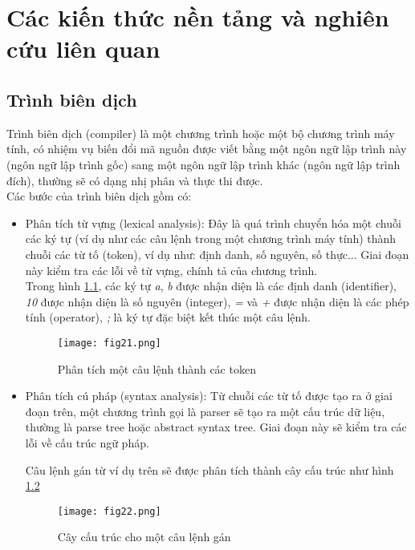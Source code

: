 \chapter{Các kiến thức nền tảng và nghiên cứu liên quan}
\section{Trình biên dịch}
Trình biên dịch (compiler) là một chương trình hoặc một bộ chương trình máy tính, có nhiệm vụ biến đổi mã nguồn được viết bằng một ngôn ngữ lập trình này (ngôn ngữ lập trình gốc) sang một ngôn ngữ lập trình khác (ngôn ngữ lập trình đích), thường sẽ có dạng nhị phân và thực thi được. \\
Các bước của trình biên dịch gồm có:
\begin{itemize}
	\item Phân tích từ vựng (lexical analysis): Đây là quá trình chuyển hóa một chuỗi các ký tự (ví dụ như các câu lệnh trong một chương trình máy tính) thành chuỗi các từ tố (token), ví dụ như: định danh, số nguyên, số thực... Giai đoạn này kiểm tra các lỗi về từ vựng, chính tả của chương trình. \\
	
	Trong hình \ref{fig:lexi}, các ký tự \textit{a}, \textit{b} được nhận diện là các định danh (identifier), \textit{10} được nhận diện là số nguyên (integer), \textit{=} và \textit{+} được nhận diện là các phép tính (operator), \textit{;} là ký tự đặc biệt kết thúc một câu lệnh.
	
	\begin{figure}[h]
		\centering
		\texttt{[image: fig21.png]}
		\caption{Phân tích một câu lệnh thành các token}
		\label{fig:lexi}
	\end{figure}
	
	\item Phân tích cú pháp (syntax analysis): Từ chuỗi các từ tố được tạo ra ở giai đoạn trên, một chương trình gọi là parser sẽ tạo ra một cấu trúc dữ liệu, thường là parse tree hoặc abstract syntax tree. Giai đoạn này sẽ kiểm tra các lỗi về cấu trúc ngữ pháp.
	
	Câu lệnh gán từ ví dụ trên sẽ được phân tích thành cây cấu trúc như hình \ref{fig:parser}
	
	\begin{figure}[h]
		\centering
		\texttt{[image: fig22.png]}
		\caption{Cây cấu trúc cho một câu lệnh gán}
		\label{fig:parser}
	\end{figure}
	

\end{itemize}
